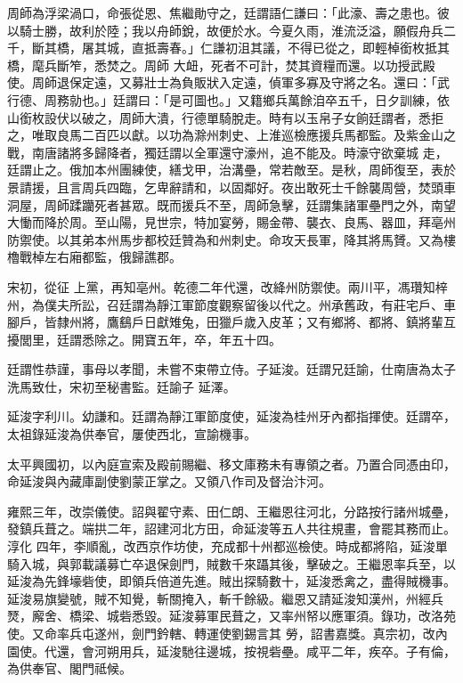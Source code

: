 \begin{pinyinscope}
 周師為浮梁渦口，命張從恩、焦繼勛守之，廷謂語仁謙曰：「此濠、壽之患也。彼以騎士勝，故利於陸；我以舟師銳，故便於水。今夏久雨，淮流泛溢，願假舟兵二千，斷其橋，屠其城，直抵壽春。」仁謙初沮其議，不得已從之，即輕棹銜枚抵其橋，麾兵斷笮，悉焚之。周師
 大衄，死者不可計，焚其資糧而還。以功授武殿使。周師退保定遠，又募壯士為負販狀入定遠，偵軍多寡及守將之名。還曰：「武行德、周務勍也。」廷謂曰：「是可圖也。」又籍鄉兵萬餘洎卒五千，日夕訓練，依山銜枚設伏以破之，周師大潰，行德單騎脫走。時有以玉帛子女餉廷謂者，悉拒之，唯取良馬二百匹以獻。以功為滁州刺史、上淮巡檢應援兵馬都監。及紫金山之戰，南唐諸將多歸降者，獨廷謂以全軍還守濠州，追不能及。時濠守欲棄城
 走，廷謂止之。俄加本州團練使，繕戈甲，治溝壘，常若敵至。是秋，周師復至，表於景請援，且言周兵四臨，乞卑辭請和，以固鄰好。夜出敢死士千餘襲周營，焚頭車洞屋，周師蹂躪死者甚眾。既而援兵不至，周師急擊，廷謂集諸軍壘門之外，南望大慟而降於周。至山陽，見世宗，特加宴勞，賜金帶、襲衣、良馬、器皿，拜亳州防禦使。以其弟本州馬步都校廷贊為和州刺史。命攻天長軍，降其將馬贇。又為樓櫓戰棹左右廂都監，俄歸譙郡。



 宋初，從征
 上黨，再知亳州。乾德二年代還，改絳州防禦使。兩川平，馮瓚知梓州，為僕夫所訟，召廷謂為靜江軍節度觀察留後以代之。州承舊政，有莊宅戶、車腳戶，皆隸州將，鷹鷂戶日獻雉兔，田獵戶歲入皮革；又有鄉將、都將、鎮將輩互擾閭里，廷謂悉除之。開寶五年，卒，年五十四。



 廷謂性恭謹，事母以孝聞，未嘗不束帶立侍。子延浚。廷謂兄廷諭，仕南唐為太子洗馬致仕，宋初至秘書監。廷諭子
 延澤。



 延浚字利川。幼謙和。廷謂為靜江軍節度使，延浚為桂州牙內都指揮使。廷謂卒，太祖錄延浚為供奉官，屢使西北，宣諭機事。



 太平興國初，以內庭宣索及殿前賜繼、移文庫務未有專領之者。乃置合同憑由印，命延浚與內藏庫副使劉蒙正掌之。又領八作司及督治汴河。



 雍熙三年，改崇儀使。詔與翟守素、田仁朗、王繼恩往河北，分路按行諸州城壘，發鎮兵葺之。端拱二年，詔建河北方田，命延浚等五人共往規畫，會罷其務而止。淳化
 四年，李順亂，改西京作坊使，充成都十州都巡檢使。時成都將陷，延浚單騎入城，與郭載議募亡卒退保劍門，賊數千來躡其後，擊破之。王繼恩率兵至，以延浚為先鋒壕砦使，即領兵倍道先進。賊出探騎數十，延浚悉禽之，盡得賊機事。延浚易旗變號，賊不知覺，斬關掩入，斬千餘級。繼恩又請延浚知漢州，州經兵燹，廨舍、橋梁、城砦悉毀。延浚募軍民葺之，又率州帑以應軍須。錄功，改洛苑使。又命率兵屯遂州，劍門鈐轄、轉運使劉錫言其
 勞，詔書嘉獎。真宗初，改內園使。代還，會河朔用兵，延浚馳往邊城，按視砦壘。咸平二年，疾卒。子有倫，為供奉官、閣門祗候。




\end{pinyinscope}
